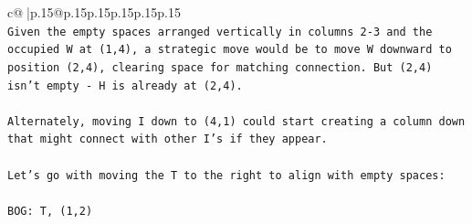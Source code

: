 \documentclass{article}
\begin{document}
{\begin{supertabular}{c@{$\;$}|p{.15\linewidth}@{}p{.15\linewidth}p{.15\linewidth}p{.15\linewidth}p{.15\linewidth}p{.15\linewidth}}
{{{\\ 
\texttt{Given the empty spaces arranged vertically in columns 2{-}3 and the occupied W at (1,4), a strategic move would be to move W downward to position (2,4), clearing space for matching connection. But (2,4) isn't empty {-} H is already at (2,4).} \\
\\ 
\texttt{Alternately, moving I down to (4,1) could start creating a column down that might connect with other I's if they appear.} \\
\\ 
\texttt{Let's go with moving the T to the right to align with empty spaces:} \\
\\ 
\texttt{BOG: T, (1,2)} \\
            }
        }
    }
     \\ \\


\end{supertabular}}
\end{document}
